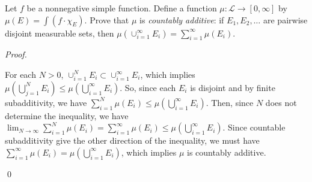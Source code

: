 \documentclass[12pt]{article}
\newenvironment{problem}[2][Problem]{\begin{trivlist}
\item[\hskip \labelsep {\bfseries #1}\hskip \labelsep {\bfseries
#2.}]}{\end{trivlist}}
\newenvironment{sol}
    {\emph{Proof.}
    }
    {
    \qed
    }
\begin{document}
      \begin{problem}{46}
        Let $f$ be a nonnegative simple function. Define a function $\mu : \mathcal{L} \to [0,\infty]$ by $\mu(E) = \int(f \cdot \chi_E)$. Prove that $\mu$ is \textit{countably additive}: if $E_1, E_2, \dots$ are pairwise disjoint measurable sets, then $\mu(\cup_{i = 1}^{\infty}E_i) = \sum_{i = 1}^{\infty}\mu(E_i)$.
      \end{problem}
      
      \begin{sol}
        For each $N > 0$, $\cup_{i = 1}^{N}E_i \subset \cup_{i = 1}^{\infty}E_i$, which implies $\mu \left( \bigcup_{j=1}^{N} E_i \right) \leq \mu \left( \bigcup_{i = 1}^{\infty} E_i \right)$. So, since each $E_i$ is disjoint and by finite subadditivity, we have $\sum_{i = 1}^{N} \mu(E_i) \leq \mu \left( \bigcup_{i = 1}^{\infty} E_i \right)$. Then, since $N$ does not determine the inequality, we have $\lim_{N \to \infty} \sum_{i = 1}^{N} \mu(E_i) = \sum_{i = 1}^{\infty} \mu(E_i) \leq \mu \left( \bigcup_{i = 1}^{\infty} E_i \right)$. Since countable subadditivity give the other direction of the inequality, we must have $\sum_{i = 1}^{\infty} \mu(E_i) = \mu \left( \bigcup_{i = 1}^{\infty} E_i \right)$, which implies $\mu$ is countably additive.
      \end{sol}
      
\end{document}
